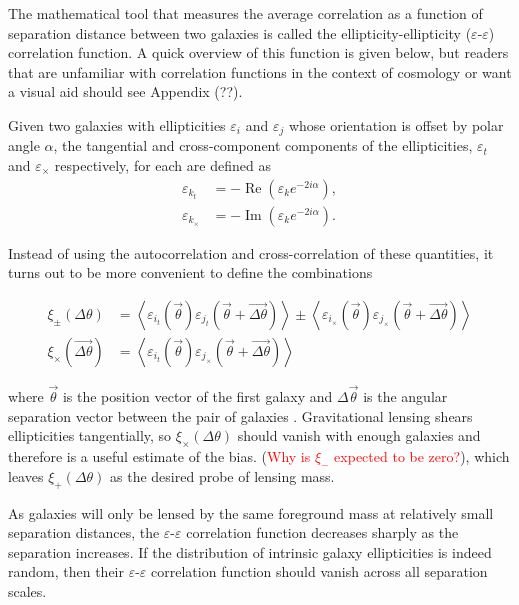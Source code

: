 \documentclass[%
 reprint,
 amsmath,amssymb,
 aps,nofootinbib
]{revtex4-1}
\begin{document}
The mathematical tool that measures the average correlation as a function of separation distance between two galaxies is called the ellipticity-ellipticity ($\varepsilon$-$\varepsilon$) correlation function. A quick overview of this function is given below, but readers that are unfamiliar with correlation functions in the context of cosmology or want a visual aid should see Appendix (??).

Given two galaxies with ellipticities $\varepsilon_i$ and $\varepsilon_j$ whose orientation is offset by polar angle $\alpha$, the tangential and cross-component components of the ellipticities, $\varepsilon_t$ and $\varepsilon_\times$ respectively, for each are defined as
\begin{align}
\varepsilon_{k_t}&=-\operatorname{Re}\left(\varepsilon_k e^{-2i\alpha}\right),\\
\varepsilon_{k_\times}&=-\operatorname{Im}\left(\varepsilon_k e^{-2i\alpha}\right).
\end{align}

\noindent Instead of using the autocorrelation and cross-correlation of these quantities, it turns out to be more convenient to define the combinations

\begin{align}\label{gg_corr_def}
\xi_\pm(\Delta\theta)&=\left<\varepsilon_{i_t}(\vec{\theta})\varepsilon_{j_t}(\vec{\theta}+\vec{\Delta\theta})\right>\pm\left<\varepsilon_{i_\times}(\vec{\theta})\varepsilon_{j_\times}(\vec{\theta}+\vec{\Delta\theta})\right>\\
\xi_\times(\vec{\Delta\theta})&=\left<\varepsilon_{i_t}(\vec{\theta})\varepsilon_{j_\times}(\vec{\theta}+\vec{\Delta\theta})\right>
\end{align}

\noindent where $\vec{\theta}$ is the position vector of the first galaxy and $\Delta\vec{\theta}$ is the angular separation vector between the pair of galaxies \cite{schneider}. Gravitational lensing shears ellipticities tangentially, so $\xi_\times(\Delta\theta)$ should vanish with enough galaxies and therefore is a useful estimate of the bias. (\textcolor{red}{Why is $\xi_-$ expected to be zero?}), which leaves $\xi_+(\Delta\theta)$ as the desired probe of lensing mass.

As galaxies will only be lensed by the same foreground mass at relatively small separation distances, the $\varepsilon$-$\varepsilon$ correlation function decreases sharply as the separation increases. If the distribution of intrinsic galaxy ellipticities is indeed random, then their $\varepsilon$-$\varepsilon$ correlation function should vanish across all separation scales. 
\end{document}
